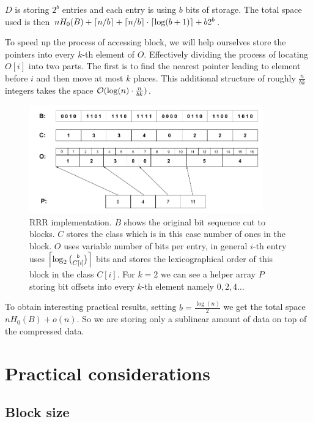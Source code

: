 $D$ is storing $2^b$ entries and each entry is using $b$ bits of storage.
The total space used is then $nH_0(B) + \left\lceil n/b \right\rceil + \left\lceil n/b \right\rceil \cdot \left\lceil \log(b+1) \right\rceil + b2^b$.

To speed up the process of accessing block, we will help ourselves store the pointers
into every $k$-th element of $O$. Effectively dividing the process of locating $O[i]$ into two
parts. The first is to find the nearest pointer leading to element before $i$ and
then move at most $k$ places. This additional structure of roughly $\frac{n}{bk}$ integers
takes the space $\mathcal{O}(\log(n)\cdot \frac{n}{bk})$.

\begin{figure}
	\centerline{
		\includegraphics[width=0.9\textwidth, height=0.3\textheight]{images/rrr}
	}
	\caption[TODO]{RRR implementation. $B$ shows the original bit sequence cut to
    blocks. $C$ stores the class which is in this case number of ones in the block.
    $O$ uses variable number of bits per entry, in general $i$-th entry uses
    $\left\lceil \log_2{b\choose C[i]} \right\rceil$ bits and stores the lexicographical order
    of this block in the class $C[i]$. For $k=2$ we can see a helper array $P$
    storing bit offsets into every $k$-th element namely $0, 2, 4\ldots$
	}
	\label{obr:RRRFinal}
\end{figure}

To obtain interesting practical results, setting $b=\frac{\log(n)}{2}$ we get the total space
$nH_0(B) + o(n)$. So we are storing only a sublinear amount of data on top of the compressed
data.

\section{Practical considerations}

\subsection{Block size}

